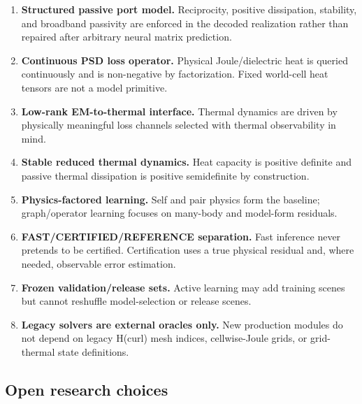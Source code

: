 \begin{enumerate}
\item \textbf{Structured passive port model.}
  Reciprocity, positive dissipation, stability, and broadband passivity are
  enforced in the decoded realization rather than repaired after arbitrary
  neural matrix prediction.

\item \textbf{Continuous PSD loss operator.}
  Physical Joule/dielectric heat is queried continuously and is non-negative by
  factorization. Fixed world-cell heat tensors are not a model primitive.

\item \textbf{Low-rank EM-to-thermal interface.}
  Thermal dynamics are driven by physically meaningful loss channels selected
  with thermal observability in mind.

\item \textbf{Stable reduced thermal dynamics.}
  Heat capacity is positive definite and passive thermal dissipation is
  positive semidefinite by construction.

\item \textbf{Physics-factored learning.}
  Self and pair physics form the baseline; graph/operator learning focuses on
  many-body and model-form residuals.

\item \textbf{FAST/CERTIFIED/REFERENCE separation.}
  Fast inference never pretends to be certified. Certification uses a true
  physical residual and, where needed, observable error estimation.

\item \textbf{Frozen validation/release sets.}
  Active learning may add training scenes but cannot reshuffle model-selection
  or release scenes.

\item \textbf{Legacy solvers are external oracles only.}
  New production modules do not depend on legacy H(curl) mesh indices,
  cellwise-Joule grids, or grid-thermal state definitions.
\end{enumerate}

\subsection{Open research choices}

